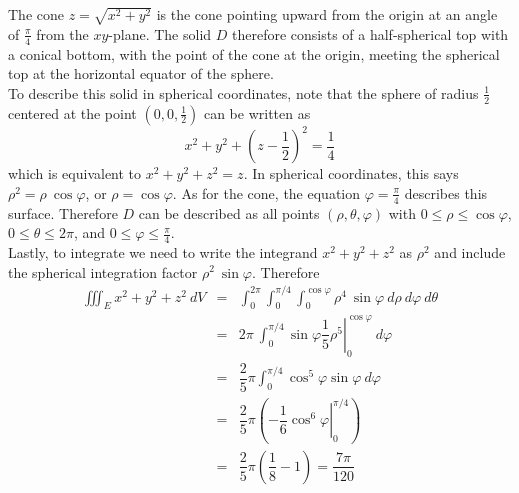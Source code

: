 {The cone $z = \sqrt{x^2 + y^2}$ is the cone pointing upward from the origin at an angle of $\frac{\pi}{4}$ from the $xy$-plane. The solid $D$ therefore consists of a half-spherical top with a conical bottom, with the point of the cone at the origin, meeting the spherical top at the horizontal equator of the sphere.\\

To describe this solid in spherical coordinates, note that the sphere of radius $\frac{1}{2}$ centered at the point $\left( 0,0,\frac{1}{2}\right)$ can be written as $$x^2 + y^2 + \left( z - \frac{1}{2}\right)^2 = \frac{1}{4}$$ which is equivalent to $x^2 + y^2 + z^2 = z$. In spherical coordinates, this says $\rho^2 = \rho \: \cos\varphi$, or $\rho = \cos\varphi$.  As for the cone, the equation $\varphi = \frac{\pi}{4}$ describes this surface.  Therefore $D$ can be described as all points $\left( \rho, \theta,\varphi\right)$ with $0 \leq \rho \leq \cos\varphi$, $0 \leq \theta \leq 2\pi$, and $0 \leq \varphi \leq \frac{\pi}{4}$.  \\

Lastly, to integrate we need to write the integrand $x^2 + y^2 + z^2$ as $\rho^2$ and include the spherical integration factor $\rho^2 \: \sin\varphi$.  Therefore
\begin{eqnarray*}
\iiint_E x^2 + y^2 + z^2 \: dV & = & \int_0^{2\pi} \int_0^{\pi/4} \int_0^{\cos\varphi} \rho^4 \: \sin\varphi \: d\rho \: d\varphi \: d\theta \\
 & = & 2\pi \: \int_0^{\pi/4} \sin\varphi \left. \dfrac{1}{5} \rho^5 \right|_{0}^{\cos\varphi} \: d\varphi \\
 & = & \dfrac{2}{5}\pi \int_0^{\pi/4} \cos^5\varphi \sin\varphi \: d\varphi \\
 & = & \dfrac{2}{5}\pi \left(\left. -\dfrac{1}{6}\cos^6\varphi \right|_{0}^{\pi/4}\right) \\
 & = & \dfrac{2}{5}\pi \left( \dfrac{1}{8} - 1 \right) = \dfrac{7\pi}{120} \\
\end{eqnarray*}
}\\

